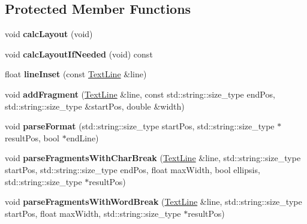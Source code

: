 \subsection*{Protected Member Functions}
\begin{DoxyCompactItemize}
\item 
void {\bfseries calc\+Layout} (void)\hypertarget{classPaintText_a6c1113750bcdd3976f1f5e793457f404}{}\label{classPaintText_a6c1113750bcdd3976f1f5e793457f404}

\item 
void {\bfseries calc\+Layout\+If\+Needed} (void) const \hypertarget{classPaintText_a4ffa10f37aa50214eec3b3d52e0484fc}{}\label{classPaintText_a4ffa10f37aa50214eec3b3d52e0484fc}

\item 
float {\bfseries line\+Inset} (const \hyperlink{structPaintText_1_1TextLine}{Text\+Line} \&line)\hypertarget{classPaintText_afb09f8848a28fc295abc9a8c6cee521d}{}\label{classPaintText_afb09f8848a28fc295abc9a8c6cee521d}

\item 
void {\bfseries add\+Fragment} (\hyperlink{structPaintText_1_1TextLine}{Text\+Line} \&line, const std\+::string\+::size\+\_\+type end\+Pos, std\+::string\+::size\+\_\+type \&start\+Pos, double \&width)\hypertarget{classPaintText_a38366a4302b6564b83a40ad22f61b2ad}{}\label{classPaintText_a38366a4302b6564b83a40ad22f61b2ad}

\item 
void {\bfseries parse\+Format} (std\+::string\+::size\+\_\+type start\+Pos, std\+::string\+::size\+\_\+type $\ast$result\+Pos, bool $\ast$end\+Line)\hypertarget{classPaintText_a203fcbc2243fafdc08fabd257977c748}{}\label{classPaintText_a203fcbc2243fafdc08fabd257977c748}

\item 
void {\bfseries parse\+Fragments\+With\+Char\+Break} (\hyperlink{structPaintText_1_1TextLine}{Text\+Line} \&line, std\+::string\+::size\+\_\+type start\+Pos, std\+::string\+::size\+\_\+type end\+Pos, float max\+Width, bool ellipsis, std\+::string\+::size\+\_\+type $\ast$result\+Pos)\hypertarget{classPaintText_aede4a97295bf5d25b1f4c323f5dc2b43}{}\label{classPaintText_aede4a97295bf5d25b1f4c323f5dc2b43}

\item 
void {\bfseries parse\+Fragments\+With\+Word\+Break} (\hyperlink{structPaintText_1_1TextLine}{Text\+Line} \&line, std\+::string\+::size\+\_\+type start\+Pos, float max\+Width, std\+::string\+::size\+\_\+type $\ast$result\+Pos)\hypertarget{classPaintText_a8b9426c849fbb81941d4d33e9e65dfa7}{}\label{classPaintText_a8b9426c849fbb81941d4d33e9e65dfa7}

\end{DoxyCompactItemize}
